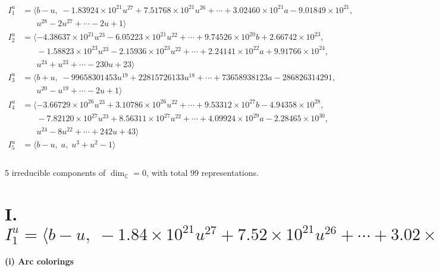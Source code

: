 \documentclass[1p]{elsarticle_modified}
\theoremstyle{definition}
\begin{document}
\begin{align*}
I^u_{1}&=\langle 
b- u,\;-1.83924\times10^{21} u^{27}+7.51768\times10^{21} u^{26}+\cdots+3.02460\times10^{21} a-9.01849\times10^{21},\\
\phantom{I^u_{1}}&\phantom{= \langle  }u^{28}-2 u^{27}+\cdots-2 u+1\rangle \\
I^u_{2}&=\langle 
-4.38637\times10^{21} u^{23}-6.05223\times10^{21} u^{22}+\cdots+9.74526\times10^{20} b+2.66742\times10^{23},\\
\phantom{I^u_{2}}&\phantom{= \langle  }-1.58823\times10^{23} u^{23}-2.15936\times10^{23} u^{22}+\cdots+2.24141\times10^{22} a+9.91766\times10^{24},\\
\phantom{I^u_{2}}&\phantom{= \langle  }u^{24}+u^{23}+\cdots-230 u+23\rangle \\
I^u_{3}&=\langle 
b+u,\;-99658301453 u^{19}+22815726133 u^{18}+\cdots+73658938123 a-286826314291,\\
\phantom{I^u_{3}}&\phantom{= \langle  }u^{20}- u^{19}+\cdots-2 u+1\rangle \\
I^u_{4}&=\langle 
-3.66729\times10^{26} u^{23}+3.10786\times10^{26} u^{22}+\cdots+9.53312\times10^{27} b-4.94358\times10^{28},\\
\phantom{I^u_{4}}&\phantom{= \langle  }-7.82120\times10^{27} u^{23}+8.56311\times10^{27} u^{22}+\cdots+4.09924\times10^{29} a-2.28465\times10^{30},\\
\phantom{I^u_{4}}&\phantom{= \langle  }u^{24}-8 u^{22}+\cdots+242 u+43\rangle \\
I^u_{5}&=\langle 
b- u,\;a,\;u^3+u^2-1\rangle \\
\\
\end{align*}
\raggedright * 5 irreducible components of $\dim_{\mathbb{C}}=0$, with total 99 representations.\\
\newpage
\renewcommand{\arraystretch}{1}
\centering \section*{I. $I^u_{1}= \langle b- u,\;-1.84\times10^{21} u^{27}+7.52\times10^{21} u^{26}+\cdots+3.02\times10^{21} a-9.02\times10^{21},\;u^{28}-2 u^{27}+\cdots-2 u+1 \rangle$}
\flushleft \textbf{(i) Arc colorings}\\
\end{document}
